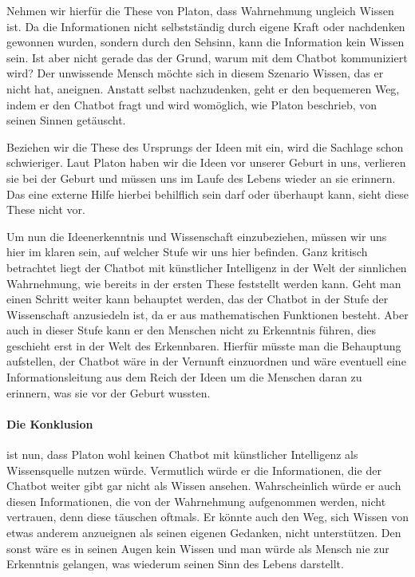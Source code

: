 Nehmen wir hierfür die These von Platon, dass Wahrnehmung ungleich Wissen ist. Da die Informationen nicht selbstständig durch eigene Kraft oder  nachdenken gewonnen wurden, sondern durch den Sehsinn, kann die Information kein Wissen sein. Ist aber nicht gerade das der Grund, warum mit dem Chatbot kommuniziert wird? Der unwissende Mensch möchte sich in diesem Szenario Wissen, das er nicht hat, aneignen. Anstatt selbst nachzudenken, geht er den bequemeren Weg, indem er den Chatbot fragt und wird womöglich, wie Platon beschrieb, von seinen Sinnen getäuscht.

Beziehen wir die These des Ursprungs der Ideen mit ein, wird die Sachlage schon schwieriger. Laut Platon haben wir die Ideen vor unserer Geburt in uns, verlieren sie bei der Geburt und müssen uns im  Laufe des Lebens wieder an sie erinnern. Das eine externe Hilfe hierbei behilflich sein darf oder überhaupt kann, sieht diese These nicht vor.

Um nun die Ideenerkenntnis und Wissenschaft einzubeziehen, müssen wir uns hier im klaren sein, auf welcher Stufe wir uns hier befinden. Ganz kritisch betrachtet liegt der Chatbot mit künstlicher Intelligenz in der Welt der sinnlichen Wahrnehmung, wie bereits in der ersten These feststellt werden kann. Geht man einen Schritt weiter kann behauptet werden, das der Chatbot in der Stufe der Wissenschaft anzusiedeln ist, da er aus mathematischen Funktionen besteht. Aber auch in dieser Stufe kann er den Menschen nicht zu Erkenntnis führen, dies geschieht erst in der Welt des Erkennbaren. Hierfür müsste man die Behauptung aufstellen, der Chatbot wäre in der Vernunft einzuordnen und wäre eventuell eine Informationsleitung aus dem Reich der Ideen um die Menschen daran zu erinnern, was sie vor der Geburt wussten.

\paragraph{Die Konklusion} ist nun, dass Platon wohl keinen Chatbot mit künstlicher Intelligenz als Wissensquelle nutzen würde. Vermutlich würde er die Informationen, die der Chatbot  weiter gibt gar nicht als Wissen ansehen. Wahrscheinlich würde er auch diesen Informationen, die von der Wahrnehmung aufgenommen werden, nicht vertrauen, denn diese täuschen oftmals. Er könnte auch den Weg, sich Wissen von etwas anderem anzueignen als seinen eigenen Gedanken, nicht unterstützen. Den sonst wäre es in seinen Augen kein Wissen und man würde als Mensch nie zur Erkenntnis gelangen, was wiederum seinen Sinn des Lebens darstellt.     






